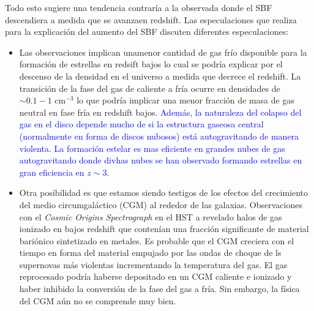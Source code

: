 \documentclass{article}
\begin{document}
Todo esto sugiere una tendencia contraría a la observada donde el SBF descendiera a medida que se avanzaen redshift. Las especulaciones que realiza \cite{finkelstein2015increasing} para la explicación del aumento del SBF discuten diferentes especulaciones:
\begin{itemize}
\item Las observaciones implican unamenor cantidad de gas frío disponible para la formación de estrellas en redsift bajos lo cual se podría explicar por el descenso de la densidad en el universo a medida que decrece el redshift. La transición de la fase del gas de caliente a fría ocurre en densidades de $\sim 0.1-1$ cm$^{-3}$ lo que podría implicar una menor fracción de masa de gas neutral en fase fría en redshift bajos. \textcolor{blue}{Además, la naturaleza del colapso del gas en el disco depende mucho de si la estructura gaseosa central (normalmente en forma de discos nubosos) está autogravitando de manera violenta. La formación estelar es mas eficiente en grandes nubes de gas autogravitando donde divhas nubes se han observado formando estrellas en gran eficiencia en $z\sim 3$}.

\item Otra posibilidad es que estamos siendo testigos de los efectos del crecimiento del medio circumgaláctico (CGM) al rededor de las galaxias. Observaciones con el \textit{Cosmic Origins Spectrograph} en el HST a revelado halos de gas ionizado en bajos redshift que contenían una fracción significante de material bariónico sintetizado en metales. Es probable que el CGM creciera con el tiempo en forma del material empujado por las ondas de choque de ls supernovas más violentas incrementando la temperatura del gas. El gas reprocesado podría haberse depositado en un CGM caliente e ionizado y haber inhibido la conversión de la fase del gas a fría. Sin embargo, la física del CGM aún no se comprende muy bien.\\


\end{itemize}
\end{document}
